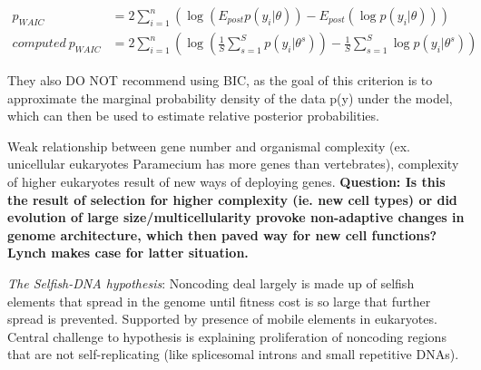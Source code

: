 \documentclass[11pt]{labbook}
\begin{document}
\begin{align*}
p_{WAIC} &= 2 \sum_{i=1}^n\left(\log{(E_{post}p(y_i|\theta))} - E_{post}(\log{p(y_i|\theta)})\right) \\
computed\ p_{WAIC} &= 2 \sum_{i=1}^n\left(\log{\left(\frac{1}{S} \sum_{s=1}^S p(y_i|\theta^s)\right)} - \frac{1}{S}\sum_{s=1}^S\log{p(y_i|\theta^s)}\right)
\end{align*}

They also DO NOT recommend using BIC, as the goal of this criterion is to approximate the marginal probability density of the data p(y) under the model, which can then be used to estimate relative posterior probabilities. 








Weak relationship between gene number and organismal complexity (ex. unicellular eukaryotes Paramecium has more genes than vertebrates), complexity of higher eukaryotes result of new ways of deploying genes.
\newline
\textbf{Question: Is this the result of selection for higher complexity (ie. new cell types) or did evolution of large size/multicellularity provoke non-adaptive changes in genome architecture, which then paved way for new cell functions? Lynch makes case for latter situation.}
\newline

\textit{The Selfish-DNA hypothesis}: \newline
Noncoding deal largely is made up of selfish elements that spread in the genome until fitness cost is so large that further spread is prevented. Supported by presence of mobile elements in eukaryotes. Central challenge to hypothesis is explaining proliferation of noncoding regions that are not self-replicating (like splicesomal introns and small repetitive DNAs). 
\end{document}
